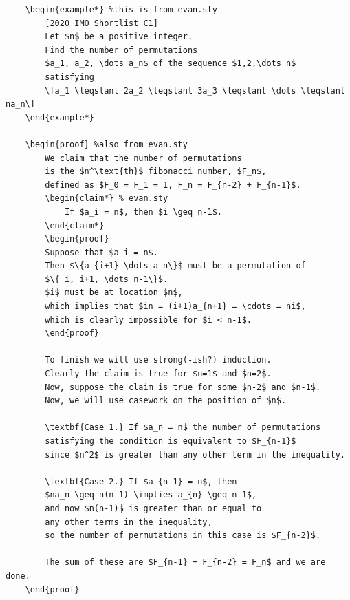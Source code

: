 \documentclass[a4paper]{scrartcl}
\begin{document}
\begin{verbatim}
	\begin{example*} %this is from evan.sty
		[2020 IMO Shortlist C1]
		Let $n$ be a positive integer. 
		Find the number of permutations 
		$a_1, a_2, \dots a_n$ of the sequence $1,2,\dots n$ 
		satisfying 
		\[a_1 \leqslant 2a_2 \leqslant 3a_3 \leqslant \dots \leqslant na_n\]
	\end{example*}

	\begin{proof} %also from evan.sty
		We claim that the number of permutations
		is the $n^\text{th}$ fibonacci number, $F_n$, 
		defined as $F_0 = F_1 = 1, F_n = F_{n-2} + F_{n-1}$.
		\begin{claim*} % evan.sty
			If $a_i = n$, then $i \geq n-1$.
		\end{claim*}
		\begin{proof}
		Suppose that $a_i = n$. 
		Then $\{a_{i+1} \dots a_n\}$ must be a permutation of 
		$\{ i, i+1, \dots n-1\}$.
		$i$ must be at location $n$,
		which implies that $in = (i+1)a_{n+1} = \cdots = ni$, 
		which is clearly impossible for $i < n-1$.
		\end{proof}

		To finish we will use strong(-ish?) induction.
		Clearly the claim is true for $n=1$ and $n=2$.
		Now, suppose the claim is true for some $n-2$ and $n-1$.
		Now, we will use casework on the position of $n$.

		\textbf{Case 1.} If $a_n = n$ the number of permutations 
		satisfying the condition is equivalent to $F_{n-1}$ 
		since $n^2$ is greater than any other term in the inequality.

		\textbf{Case 2.} If $a_{n-1} = n$, then 
		$na_n \geq n(n-1) \implies a_{n} \geq n-1$, 
		and now $n(n-1)$ is greater than or equal to 
		any other terms in the inequality, 
		so the number of permutations in this case is $F_{n-2}$.

		The sum of these are $F_{n-1} + F_{n-2} = F_n$ and we are done.
	\end{proof}
\end{verbatim}
\end{document}
